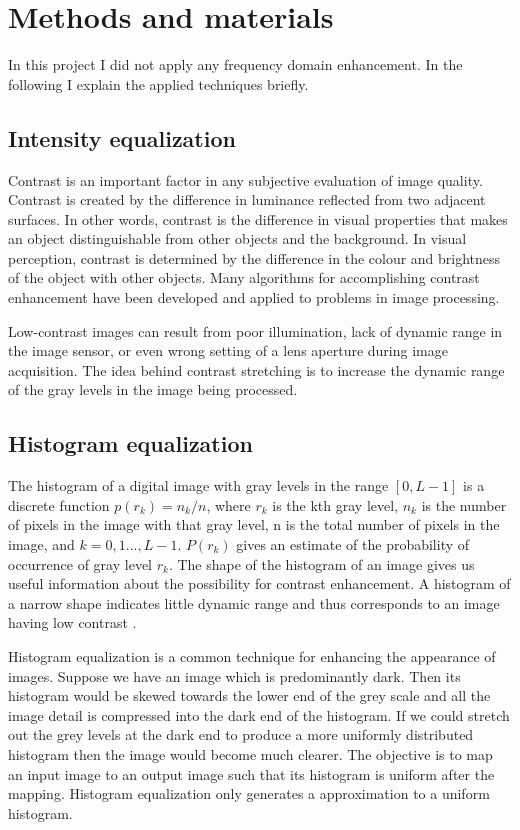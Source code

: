 \documentclass[conference]{IEEEtran}
\begin{document}
\section{Methods and materials}
In this project I did not apply any frequency domain enhancement. In the following I explain the applied techniques briefly. 
\subsection{Intensity equalization}
Contrast is an important factor in any subjective evaluation of image quality. Contrast is created by the difference in luminance reflected from two adjacent surfaces. In other words, contrast is the difference in visual properties that makes an object distinguishable from other objects and the background. In visual perception, contrast is determined by the difference in the colour and brightness of the object with other objects. Many algorithms for accomplishing contrast enhancement have been developed and applied to problems in image processing.

Low-contrast images can result from poor illumination, lack of dynamic range in the image sensor, or even wrong setting of a lens aperture during image acquisition. The idea behind contrast stretching is to increase the dynamic range of the gray levels in the image being processed.

\subsection{Histogram equalization}

The histogram of a digital image with gray levels in the range $[0,L-1]$ is a discrete function $p(r_{k})=n_{k}/n$, where $r_{k}$ is the kth gray level, $n_{k}$ is the number of pixels in the image with that gray level, n is the total number of pixels in the image, and $k=0,1...,L-1$. $P(r_{k})$ gives an estimate of the probability of occurrence of gray level $r_{k}$.
The shape of the histogram of an image gives us useful information about the possibility for contrast enhancement. A histogram of a narrow shape indicates little dynamic range and thus corresponds to an image having low contrast \cite{gonzalez}.

Histogram equalization is a common technique for enhancing the appearance of images. Suppose we have an image which is predominantly dark. Then its histogram would be skewed towards the lower end of the grey scale and all the image detail is compressed into the dark end of the histogram. If we could stretch out the grey levels at the dark end to produce a more uniformly distributed histogram then the image would become much clearer. The objective is to map an input image to an output image such that its histogram is uniform after the mapping.
Histogram equalization only generates a approximation to a uniform histogram.
\end{document}
